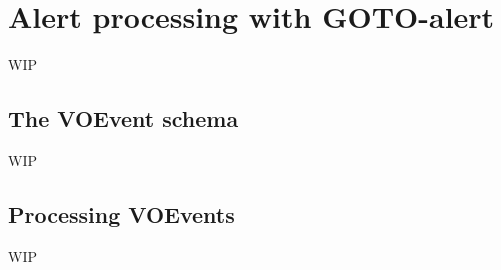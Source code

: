 \begin{colsection}
\begin{colsection}
\end{colsection}


\end{colsection}


\newpage
\section{Alert processing with GOTO-alert}
\label{sec:gotoalert}
\begin{colsection}


\begin{colsection}

WIP

\end{colsection}


\subsection{The VOEvent schema}
\label{sec:voevents}
\begin{colsection}

WIP

\end{colsection}


\subsection{Processing VOEvents}
\label{sec:alert_processing}
\begin{colsection}

WIP

\end{colsection}


\end{colsection}

